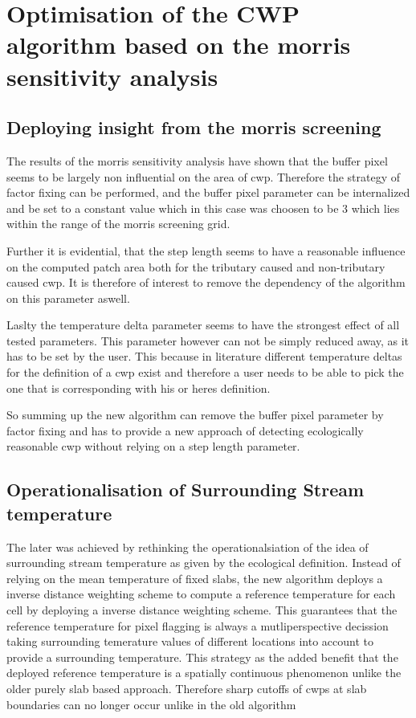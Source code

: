 \chapter{Optimisation of the CWP algorithm based on the morris sensitivity analysis}

\section{Deploying insight from the morris screening}

The results of the morris sensitivity analysis have shown that the buffer pixel seems to be largely non influential on the area of cwp. Therefore the strategy of factor fixing can be performed, and the buffer pixel parameter can be internalized and be set to a constant value which in this case was choosen to be 3 which lies within the range of the morris screening grid. 

Further it is evidential, that the step length seems to have a reasonable influence on the computed patch area both for the tributary caused and non-tributary caused cwp. It is therefore of interest to remove the dependency of the algorithm on this parameter aswell.

Laslty the temperature delta parameter seems to have the strongest effect of all tested parameters. This parameter however can not be simply reduced away, as it has to be set by the user. This because in literature different temperature deltas for the definition of a cwp exist and therefore a user needs to be able to pick the one that is corresponding with his or heres definition.


 So summing up the new algorithm can remove the buffer pixel parameter by factor fixing and has to provide a new approach of detecting ecologically reasonable cwp without relying on a step length parameter.


\section{Operationalisation of Surrounding Stream temperature}

The later was achieved by rethinking the operationalsiation of the idea of surrounding stream temperature as given by the ecological definition. Instead of relying on the mean temperature of fixed slabs, the new algorithm deploys a inverse distance weighting scheme to compute a reference temperature for each cell by deploying a inverse distance weighting scheme. This guarantees that the reference temperature for pixel flagging is always a mutliperspective decission taking surrounding temerature values of different locations into account to provide a surrounding temperature. This strategy as the added benefit that the deployed reference temperature is a spatially continuous phenomenon unlike the older purely slab based approach. Therefore sharp cutoffs of cwps at slab boundaries can no longer occur unlike in the old algorithm 

